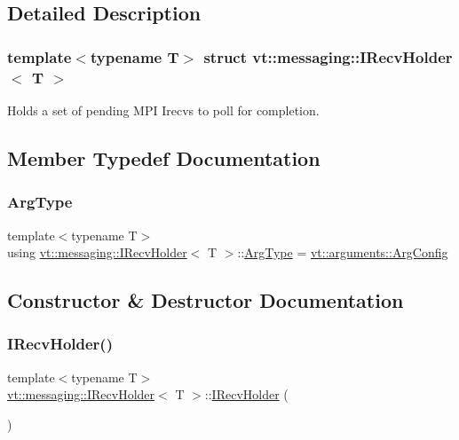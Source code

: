\subsection{Detailed Description}
\subsubsection*{template$<$typename T$>$\newline
struct vt\+::messaging\+::\+I\+Recv\+Holder$<$ T $>$}

Holds a set of pending M\+PI Irecvs to poll for completion. 

\subsection{Member Typedef Documentation}
\mbox{\label{structvt_1_1messaging_1_1_i_recv_holder_aae9327cb1e82d6aee682457739dad4b5}} 
\subsubsection{\texorpdfstring{Arg\+Type}{ArgType}}
{\footnotesize\ttfamily template$<$typename T$>$ \\
using \hyperlink{structvt_1_1messaging_1_1_i_recv_holder}{vt\+::messaging\+::\+I\+Recv\+Holder}$<$ T $>$\+::\hyperlink{structvt_1_1messaging_1_1_i_recv_holder_aae9327cb1e82d6aee682457739dad4b5}{Arg\+Type} =  \hyperlink{structvt_1_1arguments_1_1_arg_config}{vt\+::arguments\+::\+Arg\+Config}}



\subsection{Constructor \& Destructor Documentation}
\mbox{\label{structvt_1_1messaging_1_1_i_recv_holder_a709a349d723247b10bf57ca2831bfe19}} 
\subsubsection{\texorpdfstring{I\+Recv\+Holder()}{IRecvHolder()}}
{\footnotesize\ttfamily template$<$typename T$>$ \\
\hyperlink{structvt_1_1messaging_1_1_i_recv_holder}{vt\+::messaging\+::\+I\+Recv\+Holder}$<$ T $>$\+::\hyperlink{structvt_1_1messaging_1_1_i_recv_holder}{I\+Recv\+Holder} (\begin{DoxyParamCaption}{ }\end{DoxyParamCaption})\hspace{0.3cm}{\ttfamily [default]}}



